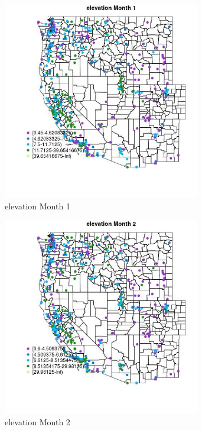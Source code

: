 \begin{figure} 
\centering  
\includegraphics[width=0.77\textwidth]{Code_Outputs/ML_input_report_ML_input_PM25_Step5_part_d_de_duplicated_aves_ML_input_MapObsMo1elevation.jpg} 
\caption{\label{fig:ML_input_report_ML_input_PM25_Step5_part_d_de_duplicated_aves_ML_inputMapObsMo1elevation}elevation Month 1} 
\end{figure} 
 

\begin{figure} 
\centering  
\includegraphics[width=0.77\textwidth]{Code_Outputs/ML_input_report_ML_input_PM25_Step5_part_d_de_duplicated_aves_ML_input_MapObsMo2elevation.jpg} 
\caption{\label{fig:ML_input_report_ML_input_PM25_Step5_part_d_de_duplicated_aves_ML_inputMapObsMo2elevation}elevation Month 2} 
\end{figure} 
 

